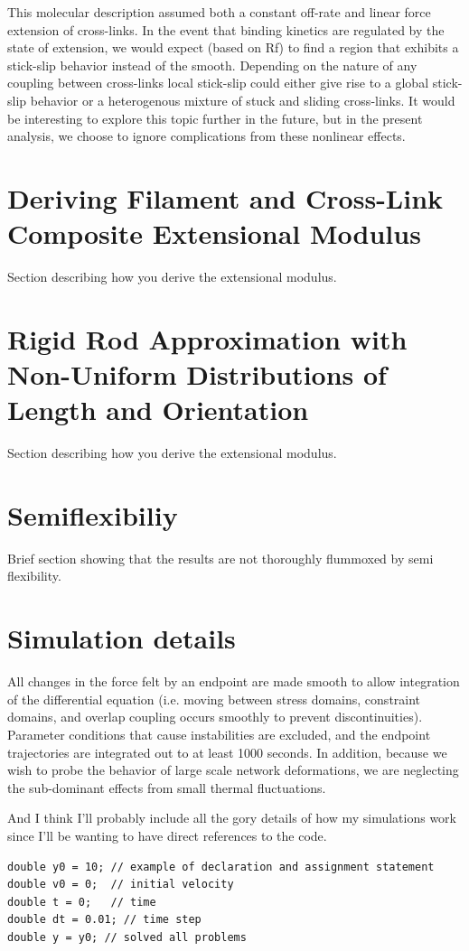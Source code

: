 \documentclass[pre,reprint]{revtex4-1}
\begin{document}
This molecular description assumed both a constant off-rate and linear force extension of cross-links.  In the event that binding kinetics are regulated by the state of extension, we would expect (based on Rf) to find a region that exhibits a stick-slip behavior instead of the smooth.  Depending on the nature of any coupling between cross-links local stick-slip could either give rise to a global stick-slip behavior or a heterogenous mixture of stuck and sliding cross-links.  It would be interesting to explore this topic further in the future, but in the present analysis, we choose to ignore complications from these nonlinear effects.

\section{Deriving Filament and Cross-Link Composite Extensional Modulus}
\label{app:compos}
Section describing how you derive the extensional modulus.

\section{Rigid Rod Approximation with Non-Uniform Distributions of Length and Orientation}
\label{app:aargh}
Section describing how you derive the extensional modulus.



\section{Semiflexibiliy}

Brief section showing that the results are not thoroughly flummoxed by semi flexibility.


\section{Simulation details}

All changes in the force felt by an endpoint are made smooth to allow integration of the differential equation (i.e. moving between stress domains, constraint domains, and overlap coupling occurs smoothly to prevent discontinuities).  Parameter conditions that cause instabilities are excluded, and the endpoint trajectories are integrated out to at least 1000 seconds. In addition, because we wish to probe the behavior of large scale network deformations, we are neglecting the sub-dominant effects from small thermal fluctuations. 


And I think I'll probably include all the gory details of how my simulations work since I'll be wanting to have direct references to the code. 
\begin{verbatim}
double y0 = 10; // example of declaration and assignment statement
double v0 = 0;  // initial velocity
double t = 0;   // time
double dt = 0.01; // time step
double y = y0; // solved all problems
\end{verbatim}



\end{document}
